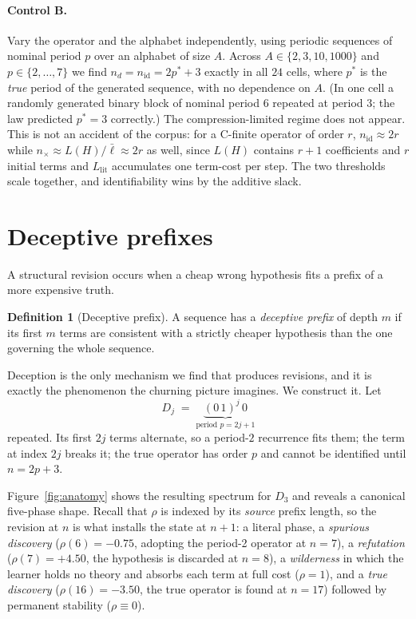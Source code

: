 \documentclass[10pt]{article}
\theoremstyle{definition}
\newtheorem{definition}{Definition}
\theoremstyle{plain}
\newcommand{\Llit}{L_{\mathrm{lit}}}
\newcommand{\nid}{n_{\mathrm{id}}}
\newcommand{\nx}{n_{\times}}
\newcommand{\nd}{n_{d}}
\begin{document}
\paragraph{Control B.} Vary the operator and the alphabet independently, using
periodic sequences of nominal period $p$ over an alphabet of size $A$. Across
$A \in \{2,3,10,1000\}$ and $p \in \{2,\dots,7\}$ we find
$\nd = \nid = 2p^{*}+3$ exactly in all $24$ cells, where $p^{*}$ is the
\emph{true} period of the generated sequence, with no dependence on $A$.
(In one cell a randomly generated binary block of nominal period $6$ repeated
at period $3$; the law predicted $p^{*}=3$ correctly.) The
compression-limited regime does not appear. This is not an accident of the
corpus: for a C-finite operator of order $r$, $\nid \approx 2r$ while
$\nx \approx L(H)/\bar{\ell} \approx 2r$ as well, since $L(H)$ contains
$r{+}1$ coefficients and $r$ initial terms and $\Llit$ accumulates one
term-cost per step. The two thresholds scale together, and identifiability
wins by the additive slack.

\section{Deceptive prefixes}
\label{sec:deception}

A structural revision occurs when a cheap wrong hypothesis fits a prefix of a
more expensive truth.

\begin{definition}[Deceptive prefix]
A sequence has a \emph{deceptive prefix} of depth $m$ if its first $m$ terms
are consistent with a strictly cheaper hypothesis than the one governing the
whole sequence.
\end{definition}

Deception is the only mechanism we find that produces revisions, and it is
exactly the phenomenon the churning picture imagines. We construct it. Let
\begin{equation}
D_j \;=\; \underbrace{(0\,1)^{j}\,0}_{\text{period } p = 2j+1}
\end{equation}
repeated. Its first $2j$ terms alternate, so a period-$2$ recurrence fits them;
the term at index $2j$ breaks it; the true operator has order $p$ and cannot be
identified until $n = 2p+3$.

Figure~\ref{fig:anatomy} shows the resulting spectrum for $D_3$ and reveals a
canonical five-phase shape. Recall that $\rho$ is indexed by its \emph{source}
prefix length, so the revision at $n$ is what installs the state at $n{+}1$:
a literal phase, a \emph{spurious discovery} ($\rho(6) = -0.75$, adopting the
period-2 operator at $n=7$), a \emph{refutation} ($\rho(7) = +4.50$, the
hypothesis is discarded at $n=8$), a \emph{wilderness} in which the learner
holds no theory and absorbs each term at full cost ($\rho = 1$), and a
\emph{true discovery} ($\rho(16) = -3.50$, the true operator is found at
$n = 17$) followed by permanent stability ($\rho \equiv 0$).
\end{document}
